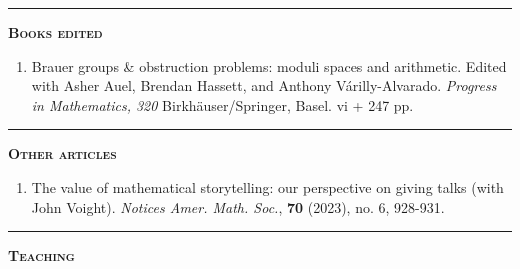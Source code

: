 \documentclass[12pt]{article}
\newcommand{\sectionheading}[1]
	{\bigskip %
	\noindent
	\hspace{-6.5mm}\textcolor{Gray}{\rule[.75mm]{21.5mm}{1mm}} %
	\hspace{.2mm}	%
	{\large{\textbf{\textsc{#1}}}} %
}
\begin{document}
	\sectionheading{Books edited}%

		\vspace{-.5ex}

		\begin{enumerate}[resume, itemsep=-1mm,leftmargin=24mm]

			\item
			Brauer groups \& obstruction problems: moduli spaces and arithmetic.  Edited with Asher Auel, Brendan Hassett, and Anthony V\'arilly-Alvarado.  \textit{Progress in Mathematics, 320} Birkh\"auser/Springer, Basel.  vi + 247 pp.
	

\end{enumerate}

	\sectionheading{Other articles}%

		\vspace{-.5ex}

		\begin{enumerate}[resume, itemsep=-1mm,leftmargin=24mm]

        \item
        The value of mathematical storytelling: our perspective on giving talks (with John Voight).  \textit{Notices Amer. Math. Soc.}, \textbf{70} (2023), no. 6, 928-931.
        			
		 \end{enumerate}




	\sectionheading{Teaching}%
	
\end{document}
